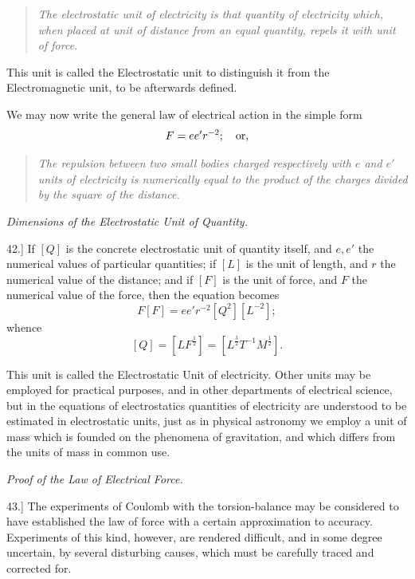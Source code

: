 \documentclass[11pt,a4paper]{article}
\begin{document}
\begin{quote}
\textit{The electrostatic unit of electricity is that quantity of
electricity which, when placed at unit of distance from an equal
quantity, repels it with unit of force.}
\end{quote}

This unit is called the Electrostatic unit to distinguish it from the
Electromagnetic unit, to be afterwards defined.

We may now write the general law of electrical action in the simple form
\[
  F = e e' r^{-2};\quad \hbox{or,}
\]

\clearpage
\setcounter{footnote}{0}

\begin{quote}
\textit{The repulsion between two small bodies charged respectively with
\(e\) and \(e'\) units of electricity is numerically equal to the
product of the charges divided by the square of the distance.}
\end{quote}

\begin{center}
\textit{Dimensions of the Electrostatic Unit of Quantity.}
\end{center}

42.] If \([Q]\) is the concrete electrostatic unit of quantity itself,
and \(e, e'\) the numerical values of particular quantities; if \([L]\)
is the unit of length, and \(r\) the numerical value of the distance;
and if \([F]\) is the unit of force, and \(F\) the numerical value of
the force, then the equation becomes
\[
  F[F] = e e' r^{-2} [Q^2][L^{-2}];
\]
whence
\[
  [Q] = [L F^{\frac12}]
      = [L^{\frac32} T^{-1} M^{\frac12}].
\]

This unit is called the Electrostatic Unit of electricity. Other units
may be employed for practical purposes, and in other departments of
electrical science, but in the equations of electrostatics quantities
of electricity are understood to be estimated in electrostatic units,
just as in physical astronomy we employ a unit of mass which is founded
on the phenomena of gravitation, and which differs from the units of
mass in common use.

\begin{center}
\textit{Proof of the Law of Electrical Force.}
\end{center}

43.] The experiments of Coulomb with the torsion-balance may be
considered to have established the law of force with a certain
approximation to accuracy. Experiments of this kind, however, are
rendered difficult, and in some degree uncertain, by several disturbing
causes, which must be carefully traced and corrected for.
\end{document}
